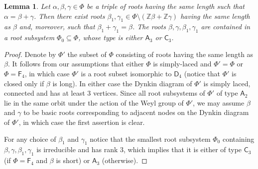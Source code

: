 \documentclass[oneside, 11pt]{amsart}
\numberwithin{equation}{section}
\newtheorem{lemma}{Lemma} \numberwithin{lemma}{section}
\theoremstyle{definition}
\theoremstyle{remark}
\newcommand{\ZZ}{\mathbb{Z}}
\newcommand{\rA}{\mathsf{A}}
\newcommand{\rC}{\mathsf{C}}
\newcommand{\rD}{\mathsf{D}}
\newcommand{\rF}{\mathsf{F}}
\begin{document}
\begin{lemma}\label{ThreeRoots}
Let \(\alpha, \beta, \gamma \in \Phi\) be a triple of roots having the same length such that $\alpha = \beta + \gamma$.  
Then there exist roots \(\beta_1, \gamma_1 \in \Phi \setminus (\ZZ\beta + \ZZ\gamma)\) having the same length as $\beta$ and, moreover, such that \(\beta_1 + \gamma_1 = \beta\). The roots $\beta, \gamma, \beta_1, \gamma_1$ are contained in a root subsystem $\Phi_0 \subseteq \Phi$, whose type is either \(\rA_3\) or \(\rC_3\). \end{lemma}
\begin{proof}
Denote by $\Phi'$ the subset of $\Phi$ consisting of roots having the same length as $\beta$.
It follows from our assumptions that either $\Phi$ is simply-laced and $\Phi' = \Phi$ or $\Phi = \rF_4$, in which case $\Phi'$ is a root subset isomorphic to $\rD_4$ (notice that $\Phi'$ is closed only if $\beta$ is long). In either case the Dynkin diagram of $\Phi'$ is simply laced, connected and has at least $3$ vertices. Since all root subsystems of $\Phi'$ of type $\rA_2$ lie in the same orbit under the action of the Weyl group of $\Phi'$, we may assume $\beta$ and $\gamma$ to be basic roots corresponding to adjacent nodes on the Dynkin diagram of $\Phi'$, in which case the first assertion is clear.

For any choice of $\beta_1$ and $\gamma_1$ notice that the smallest root subsystem $\Phi_0$ containing $\beta, \gamma, \beta_1, \gamma_1$ is irreducible and has rank $3$, which implies that it is either of type $\rC_3$ (if $\Phi = \rF_4$ and $\beta$ is short) or $\rA_3$ (otherwise). \end{proof}
\end{document}
